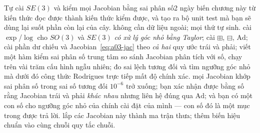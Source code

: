 \documentclass[../../vslam.tex]{subfiles}
\begin{document}
\begin{duan}{Tự cài \(SE(3)\) và kiểm mọi Jacobian bằng sai phân số}{2 ngày}
\dmt biến chương này từ kiến thức đọc được thành kiến thức kiểm được, và tạo ra bộ unit test mà bạn sẽ dùng lại suốt phần còn lại của cây.
\ddl không cần dữ liệu ngoài; mọi thứ tự sinh.
\dbc cài \(\exp\)/\(\log\) cho \(SO(3)\) và \(SE(3)\) \emph{có xử lý góc nhỏ bằng Taylor}; cài \(\boxplus\), \(\boxminus\), \(\mathrm{Ad}\); cài phần dư chiếu và Jacobian~\eqref{eq:a03-jac} theo \emph{cả hai} quy ước trái và phải; viết một hàm kiểm sai phân số trung tâm so sánh Jacobian phân tích với số, chạy trên vài trăm cấu hình ngẫu nhiên; đo sai lệch tương đối và tìm ngưỡng góc nhỏ mà dưới đó công thức Rodrigues trực tiếp mất độ chính xác.
\dxk mọi Jacobian khớp sai phân số trong sai số tương đối \(10^{-6}\) trở xuống; bạn xác nhận được bằng số rằng Jacobian trái và phải \emph{khác nhau} nhưng liên hệ đúng qua \(\mathrm{Ad}\); và bạn có một con số cho ngưỡng góc nhỏ của chính cài đặt của mình --- con số đó là một mục trong  được trả lời.
\dnv {} lắp các Jacobian này thành ma trận thưa;  thêm biến hiệu chuẩn vào cùng chuỗi quy tắc chuỗi.
\end{duan}
\end{document}
